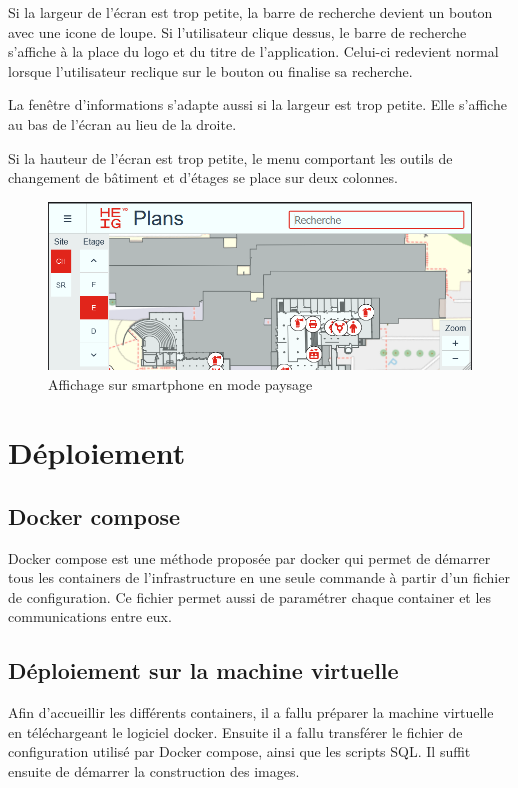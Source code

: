 \documentclass[
    iai, %
    il, %
]{heig-tb}
\begin{document}
Si la largeur de l'écran est trop petite, la barre de recherche devient un bouton avec une icone de loupe.
Si l'utilisateur clique dessus, le barre de recherche s'affiche à la place du logo et du titre de l'application.
Celui-ci redevient normal lorsque l'utilisateur reclique sur le bouton ou finalise sa recherche.

La fenêtre d'informations s'adapte aussi si la largeur est trop petite.
Elle s'affiche au bas de l'écran au lieu de la droite.

Si la hauteur de l'écran est trop petite, le menu comportant les outils de changement de bâtiment et d'étages
se place sur deux colonnes.

\begin{figure}[h]
    \centering
    \includegraphics[scale=0.5]{frontend-responsive-paysage.png}
    \caption{Affichage sur smartphone en mode paysage}
\end{figure}

\section{Déploiement}

\subsection{Docker compose}
Docker compose est une méthode proposée par \gls{docker} qui permet de démarrer tous les containers de l'infrastructure en une seule commande à partir d'un fichier de configuration.
Ce fichier permet aussi de paramétrer chaque container et les communications entre eux.

\subsection{Déploiement sur la machine virtuelle}
Afin d'accueillir les différents containers, il a fallu préparer la machine virtuelle en téléchargeant le logiciel \gls{docker}.
Ensuite il a fallu transférer le fichier de configuration utilisé par Docker compose, ainsi que les scripts SQL.
Il suffit ensuite de démarrer la construction des images.
\end{document}
